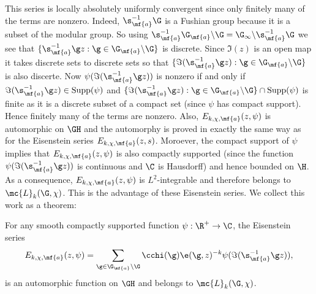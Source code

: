     This series is locally absolutely uniformly convergent since only finitely many of the terms are nonzero. Indeed, $\s_{\mf{a}}^{-1}\G$ is a Fushian group because it is a subset of the modular group. So using $\s_{\mf{a}}^{-1}\G_{\mf{a}}\backslash\G = \G_{\infty}\backslash\s_{\mf{a}}^{-1}\G$ we see that $\{\s_{\mf{a}}^{-1}\g z:\g \in \G_{\mf{a}}\backslash\G\}$ is discrete. Since $\Im(z)$ is an open map it takes discrete sets to discrete sets so that $\{\Im(\s_{\mf{a}}^{-1}\g z):\g \in \G_{\mf{a}}\backslash\G\}$ is also discerte. Now $\psi(\Im(\s_{\mf{a}}^{-1}\g z))$ is nonzero if and only if $\Im(\s_{\mf{a}}^{-1}\g z) \in \mathrm{Supp}(\psi)$ and $\{\Im(\s_{\mf{a}}^{-1}\g z):\g \in \G_{\mf{a}}\backslash\G\} \cap \mathrm{Supp}(\psi)$ is finite as it is a discrete subset of a compact set (since $\psi$ has compact support). Hence finitely many of the terms are nonzero. Also, $E_{k,\chi,\mf{a}}(z,\psi)$ is automorphic on $\GH$ and the automorphy is proved in exactly the same way as for the Eisenstein series $E_{k,\chi,\mf{a}}(z,s)$. Moroever, the compact support of $\psi$ implies that $E_{k,\chi,\mf{a}}(z,\psi)$ is also compactly supported (since the function $\psi(\Im(\s_{\mf{a}}^{-1}\g z))$ is continuous and $\C$ is Hausdorff) and hence bounded on $\H$. As a consequence, $E_{k,\chi,\mf{a}}(z,\psi)$ is $L^{2}$-integrable and therefore belongs to $\mc{L}_{k}(\G,\chi)$. This is the advantage of these Eisenstein series. We collect this work as a theorem:

    \begin{theorem}
      For any smooth compactly supported function $\psi:\R^{+} \to \C$, the Eisenstein series
      \[
        E_{k,\chi,\mf{a}}(z,\psi) = \sum_{\g \in \G_{\mf{a}}\backslash\G}\cchi(\g)\e(\g,z)^{-k}\psi(\Im(\s_{\mf{a}}^{-1}\g z)),
      \]
      is an automorphic function on $\GH$ and belongs to $\mc{L}_{k}(\G,\chi)$.
    \end{theorem}
    
